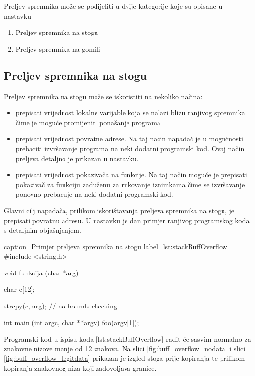 \documentclass[times, utf8, diplomski, numeric]{fer}
\begin{document}
Preljev spremnika može se podijeliti u dvije kategorije koje su
opisane u nastavku:

\begin{enumerate}
\item Preljev spremnika na stogu
\item Preljev spremnika na gomili
\end{enumerate}

\subsection{Preljev spremnika na stogu}

Preljev spremnika na stogu može se iskoristiti na nekoliko
načina:

\begin{itemize}
\item prepisati vrijednost lokalne varijable koja se nalazi blizu
ranjivog spremnika čime je moguće promijeniti ponašanje programa
\item prepisati vrijednost povratne adrese. Na taj način napadač
je u mogućnosti prebaciti izvršavanje programa na neki dodatni 
programski kod. Ovaj način preljeva detaljno je prikazan u nastavku.
\item prepisati vrijednost pokazivača na funkcije. Na taj način
moguće je prepisati pokazivač za funkciju zaduženu za rukovanje
iznimkama čime se izvršavanje ponovno prebacuje na neki dodatni 
programski kod.
\end{itemize}

Glavni cilj napadača, prilikom iskorištavanja preljeva spremnika
na stogu, je prepisati povratnu adresu. U nastavku je dan primjer
ranjivog programskog koda s detaljnim objašnjenjem.

\begin{ispis} {caption=Primjer preljeva spremnika na stogu} {label=lst:stackBuffOverflow}
#include <string.h>
 
void funkcija (char *arg)
{
   char  c[12];
 
   strcpy(c, arg);  // no bounds checking
}
 
int main (int argc, char **argv)
{
   foo(argv[1]);
}
\end{ispis}

Programski kod u ispisu koda \ref{lst:stackBuffOverflow} radit će
sasvim normalno za znakovne nizove manje od 12 znakova. Na slici 
\ref{fig:buff_overflow_nodata} i slici 
\ref{fig:buff_overflow_legitdata} prikazan je izgled stoga prije
kopiranja te prilikom kopiranja znakovnog niza koji zadovoljava
granice.
\end{document}
